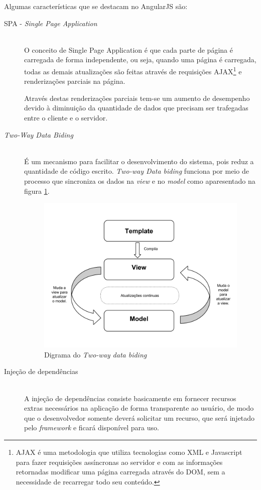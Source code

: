 Algumas características que se destacam no AngularJS são:
\begin{description}
\item[SPA - \textit{Single Page Application}] \hfill \\ 
O conceito de Single Page Application é que cada parte de página é carregada de forma independente, ou seja, quando uma página é carregada, todas as demais atualizações são feitas através de requisições AJAX\footnote{AJAX é uma metodologia que utiliza tecnologias como XML e Javascript para fazer requisições assíncronas ao servidor e com as informações retornadas modificar uma página carregada através do DOM, sem a necessidade de recarregar todo seu conteúdo.} e renderizações parciais na página.

    Através destas renderizações parciais tem-se um aumento de desempenho devido à diminuição da quantidade de dados que precisam ser trafegadas entre o cliente e o servidor.

\item[\textit{Two-Way Data Biding}] \hfill \\
É um mecanismo para facilitar o desenvolvimento do sistema, pois reduz a quantidade de código escrito.
\textit{Two-way Data biding} funciona por meio de processo que sincroniza os dados na \textit{view} e no \textit{model} como aparesentado na figura \ref{fig:Two-way databiding}. 

\begin{figure}[htb]
\centering
\includegraphics[scale=0.35]{images/Two_way_databiding_diagram.png}
\caption{Digrama do \textit{Two-way data biding} \cite{TwoWayData}}
\label{fig:Two-way databiding}
\end{figure}

\newpage

\item[Injeção de dependências] \hfill \\
A injeção de dependências consiste basicamente  em fornecer recursos extras necessários na aplicação de forma transparente ao usuário, de modo que o desenvolvedor somente deverá solicitar um recurso, que será injetado pelo \textit{framework} e ficará disponível para uso.
\end{description}

